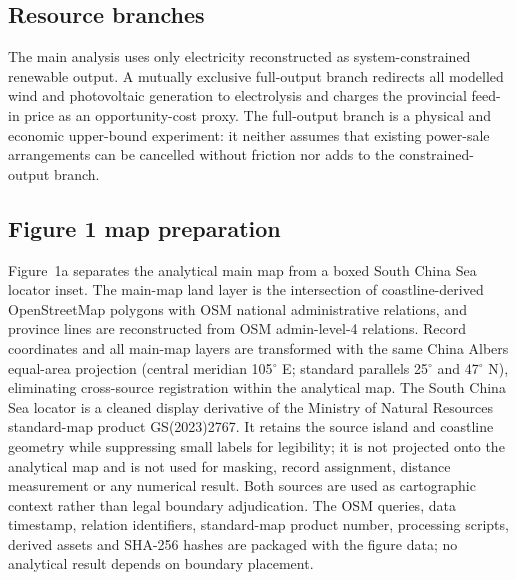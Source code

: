 \documentclass[pdflatex,sn-nature]{sn-jnl}
\begin{document}
\subsection{Resource branches}

The main analysis uses only electricity reconstructed as system-constrained renewable output. A mutually exclusive full-output branch redirects all modelled wind and photovoltaic generation to electrolysis and charges the provincial feed-in price as an opportunity-cost proxy. The full-output branch is a physical and economic upper-bound experiment: it neither assumes that existing power-sale arrangements can be cancelled without friction nor adds to the constrained-output branch.

\subsection{Figure 1 map preparation}

Figure~1a separates the analytical main map from a boxed South China Sea locator inset. The main-map land layer is the intersection of coastline-derived OpenStreetMap polygons with OSM national administrative relations, and province lines are reconstructed from OSM admin-level-4 relations\cite{osmcoast}. Record coordinates and all main-map layers are transformed with the same China Albers equal-area projection (central meridian 105$^\circ$ E; standard parallels 25$^\circ$ and 47$^\circ$ N), eliminating cross-source registration within the analytical map. The South China Sea locator is a cleaned display derivative of the Ministry of Natural Resources standard-map product GS(2023)2767\cite{mnrmap2023}. It retains the source island and coastline geometry while suppressing small labels for legibility; it is not projected onto the analytical map and is not used for masking, record assignment, distance measurement or any numerical result. Both sources are used as cartographic context rather than legal boundary adjudication. The OSM queries, data timestamp, relation identifiers, standard-map product number, processing scripts, derived assets and SHA-256 hashes are packaged with the figure data; no analytical result depends on boundary placement.
\end{document}

